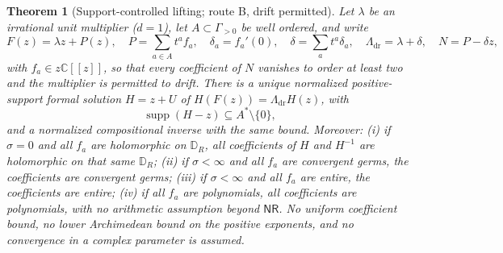 \documentclass[11pt,letterpaper]{article}
\newtheorem{theorem}{Theorem}[section]
\theoremstyle{definition}
\theoremstyle{remark}
\newcommand{\C}{\mathbb C}
\newcommand{\supp}{\operatorname{supp}}
\newcommand{\nres}{\mathsf{NR}}
\numberwithin{equation}{section}
\begin{document}
\begin{theorem}[Support-controlled lifting; route B, drift permitted]
\label{dyn:thm:lifting}
Let $\lambda$ be an irrational unit multiplier ($d=1$), let
$A\subset\Gamma_{>0}$ be well ordered, and write
\begin{equation}\label{dyn:eq:data}
 F(z)=\lambda z+P(z),\quad P=\sum_{a\in A}t^{a}f_a,\quad
 \delta_a=f_a'(0),\quad \delta=\sum_at^{a}\delta_a,\quad
 \Lambda_{\mathrm{dr}}=\lambda+\delta,\quad N=P-\delta z,
\end{equation}
with $f_a\in z\C[[z]]$, so that every coefficient of $N$ vanishes to order
at least two and the multiplier is permitted to \emph{drift}. There is a
unique normalized positive-support formal solution $H=z+U$ of
$H(F(z))=\Lambda_{\mathrm{dr}}H(z)$, with
\begin{equation}\label{dyn:eq:supportcertificate}
 \supp(H-z)\subseteq A^{*}\setminus\{0\},
\end{equation}
and a normalized compositional inverse with the same bound. Moreover:
(i) if $\sigma=0$ and all $f_a$ are holomorphic on $\mathbb D_R$, all
coefficients of $H$ and $H^{-1}$ are holomorphic on that same
$\mathbb D_R$; (ii) if $\sigma<\infty$ and all $f_a$ are convergent germs,
the coefficients are convergent germs; (iii) if $\sigma<\infty$ and all
$f_a$ are entire, the coefficients are entire; (iv) if all $f_a$ are
polynomials, all coefficients are polynomials, with no arithmetic
assumption beyond $\nres$. No uniform coefficient bound, no lower
Archimedean bound on the positive exponents, and no convergence in a
complex parameter is assumed.
\end{theorem}
\end{document}
